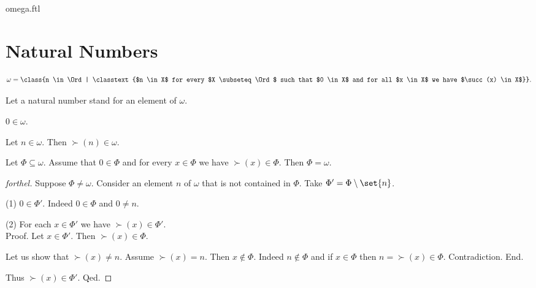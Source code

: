 \documentclass{naproche-library}
\begin{document}
\begin{smodule}{omega.ftl}

  \section*{Natural Numbers}

  \begin{definition}[forthel,id=SET_THEORY_03_4310076227584000,printid]
    \[ \omega = \class{n \in \Ord | \classtext{$n \in X$ for every $X \subseteq \Ord$ such that $0 \in X$ and for all $x \in X$ we have $\succ(x) \in X$}}. \]

  Let a natural number stand for an element of $\omega$.
  \end{definition}

  \begin{proposition}[forthel,id=SET_THEORY_03_3576717620805632,printid]
    $0 \in \omega$.
  \end{proposition}

  \begin{proposition}[forthel,id=SET_THEORY_03_8807317141192704,printid]
    Let $n \in \omega$.
    Then $\succ(n) \in \omega$.
  \end{proposition}

  \begin{proposition}[forthel,id=SET_THEORY_03_344585425387520,printid]
    Let $\Phi \subseteq \omega$.
    Assume that $0 \in \Phi$ and for every $x \in \Phi$ we have
    $\succ(x) \in \Phi$.
    Then $\Phi = \omega$.
  \end{proposition}
  \begin{proof}[forthel]
    Suppose $\Phi \neq \omega$.
    Consider an element $n$ of $\omega$ that is not contained in $\Phi$.
    Take $\Phi' = \Phi \setminus \set{n}$.

    (1) $0 \in \Phi'$.
    Indeed $0 \in \Phi$ and $0 \neq n$.

    (2) For each $x \in \Phi'$ we have $\succ(x) \in \Phi'$. \\
    Proof.
      Let $x \in \Phi'$.
      Then $\succ(x) \in \Phi$.

      Let us show that $\succ(x) \neq n$.
        Assume $\succ(x) = n$.
        Then $x \notin \Phi$.
        Indeed $n \notin \Phi$ and if $x \in \Phi$ then
        $n = \succ(x) \in \Phi$.
        Contradiction.
      End.

      Thus $\succ(x) \in \Phi'$.
    Qed.


\end{proof}
\end{smodule}
\end{document}
